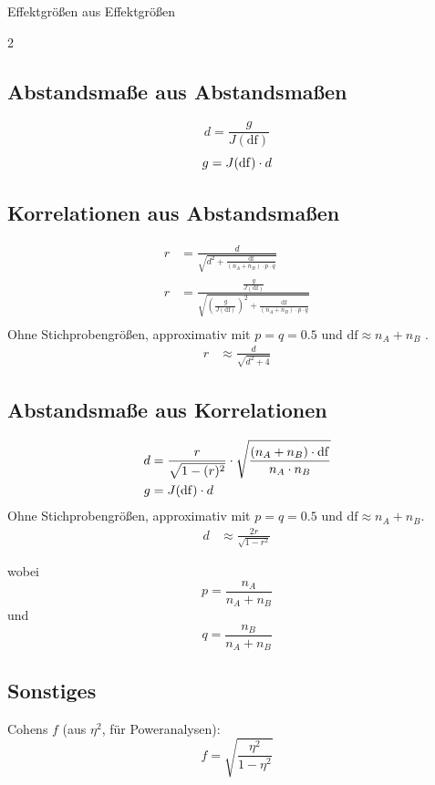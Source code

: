 \begin{formulaBox}{Effektgrößen aus Effektgrößen}{}
\begin{multicols}{2}

\subsection*{Abstandsmaße aus Abstandsmaßen}
$$d=\frac{g}{J(\mathrm{df})}$$
$$g=J(\mathrm{df})\cdot d$$

\subsection*{Korrelationen aus Abstandsmaßen}
\begin{align*}
r&=\frac{d}{\sqrt{d^2+\frac{\mathrm{df}}{(n_A+n_B)\cdot p\cdot q}}}\\
r&=\frac{\frac{g}{J(\mathrm{df})}}{\sqrt{\left(\frac{g}{J(\mathrm{df})}\right)^2+\frac{\mathrm{df}}{(n_A+n_B)\cdot p\cdot q}}}\\
\end{align*}
Ohne Stichprobengrößen, approximativ mit $p=q=0.5$ und $\mathrm{df}\approx n_A+n_B$ \parencite[z. B.][Formel~2.2.6]{cohen1988}.
\begin{align*}
r&\approx\frac{d}{\sqrt{d^2+4}}
\end{align*}
\subsection*{Abstandsmaße aus Korrelationen}
\begin{align*}
d&=\frac{r}{\sqrt{1-(r)^2}}\cdot\sqrt{\frac{(n_A+n_B)\cdot \mathrm{df}}{n_A\cdot n_B}}\\
g&=J(\mathrm{df})\cdot d\\
\end{align*}
Ohne Stichprobengrößen, approximativ mit $p=q=0.5$ und $\mathrm{df}\approx n_A+n_B$.
\begin{align*}
d&\approx\frac{2r}{\sqrt{1-r^2}}
\end{align*}

wobei $$p=\frac{n_A}{n_A+n_B}$$ und $$q=\frac{n_B}{n_A+n_B}$$

\subsection*{Sonstiges}
Cohens $f$ (aus $\eta^2$, für Poweranalysen):
\[
f = \sqrt{\frac{\eta^2}{1-\eta^2}}
\]
\end{multicols}
\end{formulaBox}


